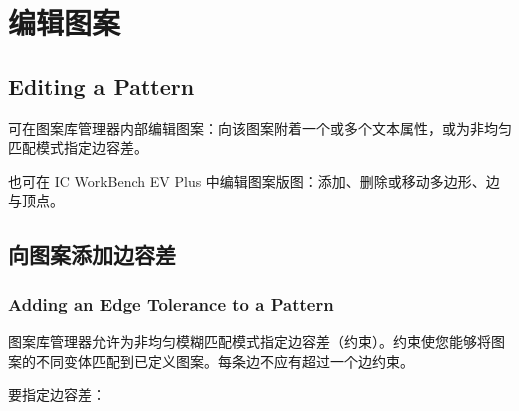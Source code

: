 \section{编辑图案}
\subsection*{Editing a Pattern}

可在图案库管理器内部编辑图案：向该图案附着一个或多个文本属性，或为非均匀匹配模式指定边容差。

也可在 IC WorkBench EV Plus 中编辑图案版图：添加、删除或移动多边形、边与顶点。

\subsection{向图案添加边容差}
\subsubsection*{Adding an Edge Tolerance to a Pattern}

图案库管理器允许为非均匀模糊匹配模式指定边容差（约束）。约束使您能够将图案的不同变体匹配到已定义图案。每条边不应有超过一个边约束。

要指定边容差：

